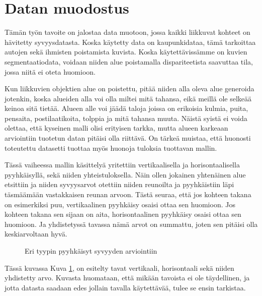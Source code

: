 \section{Datan muodostus}

Tämän työn tavoite on jalostaa data muotoon, jossa kaikki liikkuvat kohteet on hävitetty syvyysdatasta.
Koska käytetty data on kaupunkidataa, tämä tarkoittaa autojen sekä ihmisten poistamista kuvista.
Koska käytettävissämme on kuvien segmentaatiodata, voidaan niiden alue poistamalla dispariteetista saavuttaa tila, jossa niitä ei oteta huomioon.

Kun liikkuvien objektien alue on poistettu, pitää niiden alla oleva alue generoida jotenkin,
koska alueiden alla voi olla miltei mitä tahansa,
eikä meillä ole selkeää keinoa sitä tietää. 
Alueen alle voi jäädä taloja joissa on erikoisia kulmia, puita, pensaita, postilaatikoita, tolppia ja mitä tahansa muuta. 
Näistä syistä ei voida olettaa, että kyseinen malli olisi erityisen tarkka, 
mutta alueen karkeaan arviointiin tuotetun datan pitäisi olla riittävä.
On tärkeä muistaa, että huonosti toteutettu datasetti tuottaa myös huonoja tuloksia tuottavan mallin.

Tässä vaiheessa mallin käsittelyä yritettiin vertikaalisella ja horisontaalisella pyyhkäisyllä, sekä niiden yhteistuloksella.
Näin ollen jokainen yhtenäinen alue etsittiin ja niiden syvyysarvot otettiin niiden reunoilta
ja pyyhkäistiin läpi täsmäämään vastakkaisen reunan arvoon.
Tästä seuraa, että jos kohteen takana on esimerkiksi puu, vertikaalinen pyyhkäisy osaisi ottaa sen huomioon.
Jos kohteen takana sen sijaan on aita, horisontaalinen pyyhkäisy osaisi ottaa sen huomioon.
Ja yhdistetyssä tavassa nämä arvot on summattu, joten sen pitäisi olla keskiarvoltaan hyvä. 

\begin{figure}[h]
    \centering
    \caption{Eri tyypin pyyhkäisyt syvyyden arviointiin}
    \label{fig:swipe}
\end{figure}

Tässä kuvassa Kuva \ref{fig:swipe}, on esitelty tavat vertikaali, horisontaali sekä niiden yhdistetty arvo. 
Kuvasta huomataan, että mikään tavoista ei ole täydellinen,
ja jotta datasta saadaan edes jollain tavalla käytettävää, tulee se ensin tarkistaa. 

